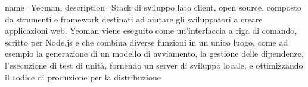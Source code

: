{
	name=Yeoman,
	description={Stack di sviluppo lato client, open source, composto da strumenti e framework destinati ad aiutare gli sviluppatori a creare applicazioni web. Yeoman viene eseguito come un'interfaccia a riga di comando, scritto per Node.js e che combina diverse funzioni in un unico luogo, come ad esempio la generazione di un modello di avviamento, la gestione delle dipendenze, l'esecuzione di test di unità, fornendo un server di sviluppo locale, e ottimizzando il codice di produzione per la distribuzione}
}

